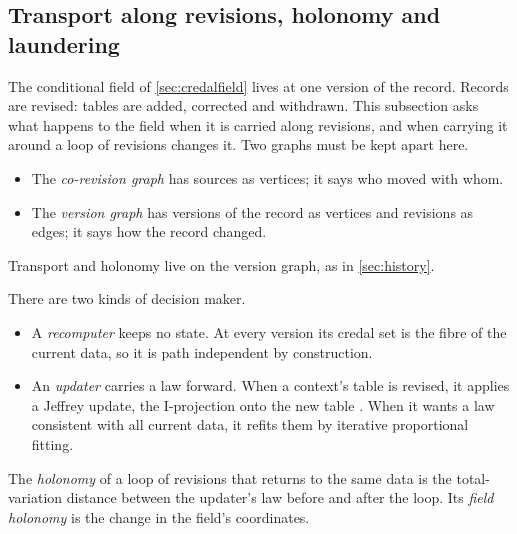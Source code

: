\documentclass[11pt]{article}
\theoremstyle{definition}\newtheorem{definition}[theorem]{Definition}\newtheorem{remark}[theorem]{Remark}\newtheorem{example}[theorem]{Example}\newtheorem{problem}[theorem]{Open problem}\crefname{problem}{Problem}{Problems}
\begin{document}
\subsection{Transport along revisions, holonomy and laundering}\label{sec:revholonomy}
The conditional field of \cref{sec:credalfield} lives at one version of the record. Records are revised: tables are added, corrected and withdrawn. This subsection asks what happens to the field when it is carried along revisions, and when carrying it around a loop of revisions changes it. Two graphs must be kept apart here.
\begin{itemize}
\item The \emph{co-revision graph} has sources as vertices; it says who moved with whom.
\item The \emph{version graph} has versions of the record as vertices and revisions as edges; it says how the record changed.
\end{itemize}
Transport and holonomy live on the version graph, as in \cref{sec:history}.

There are two kinds of decision maker.
\begin{itemize}
\item A \emph{recomputer} keeps no state. At every version its credal set is the fibre of the current data, so it is path independent by construction.
\item An \emph{updater} carries a law forward. When a context's table is revised, it applies a Jeffrey update, the I-projection onto the new table \cite{Csiszar1975}. When it wants a law consistent with all current data, it refits them by iterative proportional fitting.
\end{itemize}
The \emph{holonomy} of a loop of revisions that returns to the same data is the total-variation distance between the updater's law before and after the loop. Its \emph{field holonomy} is the change in the field's coordinates.
\end{document}

